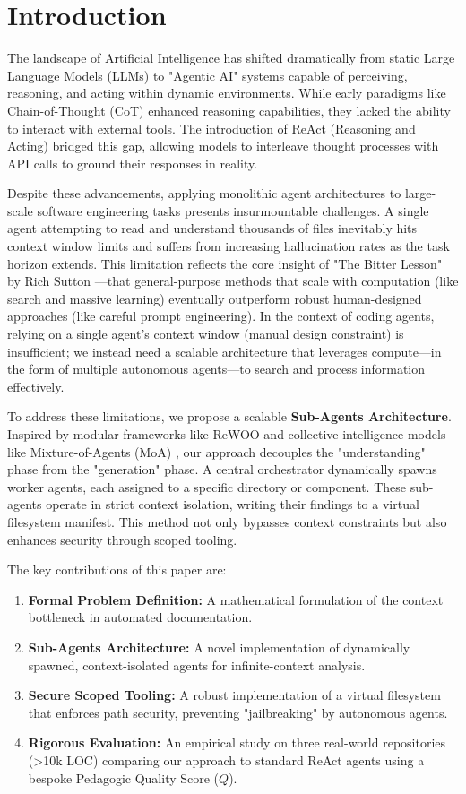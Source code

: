 \documentclass[conference]{IEEEtran}
\begin{document}
\section{Introduction}
The landscape of Artificial Intelligence has shifted dramatically from static Large Language Models (LLMs) to "Agentic AI" systems capable of perceiving, reasoning, and acting within dynamic environments. While early paradigms like Chain-of-Thought (CoT) \cite{cot} enhanced reasoning capabilities, they lacked the ability to interact with external tools. The introduction of ReAct (Reasoning and Acting) \cite{b1} bridged this gap, allowing models to interleave thought processes with API calls to ground their responses in reality.

Despite these advancements, applying monolithic agent architectures to large-scale software engineering tasks presents insurmountable challenges. A single agent attempting to read and understand thousands of files inevitably hits context window limits and suffers from increasing hallucination rates as the task horizon extends. This limitation reflects the core insight of "The Bitter Lesson" by Rich Sutton \cite{b7}---that general-purpose methods that scale with computation (like search and massive learning) eventually outperform robust human-designed approaches (like careful prompt engineering). In the context of coding agents, relying on a single agent's context window (manual design constraint) is insufficient; we instead need a scalable architecture that leverages compute---in the form of multiple autonomous agents---to search and process information effectively.

To address these limitations, we propose a scalable \textbf{Sub-Agents Architecture}. Inspired by modular frameworks like ReWOO \cite{b2} and collective intelligence models like Mixture-of-Agents (MoA) \cite{b4}, our approach decouples the "understanding" phase from the "generation" phase. A central orchestrator dynamically spawns worker agents, each assigned to a specific directory or component. These sub-agents operate in strict context isolation, writing their findings to a virtual filesystem manifest. This method not only bypasses context constraints but also enhances security through scoped tooling.

The key contributions of this paper are:
\begin{enumerate}
    \item \textbf{Formal Problem Definition:} A mathematical formulation of the context bottleneck in automated documentation.
    \item \textbf{Sub-Agents Architecture:} A novel implementation of dynamically spawned, context-isolated agents for infinite-context analysis.
    \item \textbf{Secure Scoped Tooling:} A robust implementation of a virtual filesystem that enforces path security, preventing "jailbreaking" by autonomous agents.
    \item \textbf{Rigorous Evaluation:} An empirical study on three real-world repositories (>10k LOC) comparing our approach to standard ReAct agents using a bespoke Pedagogic Quality Score ($Q$).
\end{enumerate}
\end{document}
